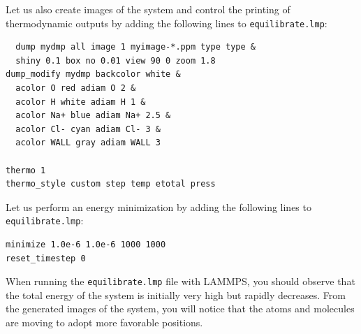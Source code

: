 \documentclass[9pt,tutorial]{livecoms}
\newcommand{\lmpcmd}[1]{\colorbox{listing}{\textcolor{command}{\small{#1}}}} %
\newcommand{\flecmd}[1]{\textcolor{command}{\texttt{#1}}} %
\begin{document}
Let us also create images of the system and control
the printing of thermodynamic outputs by adding the following lines
to \flecmd{equilibrate.lmp}:
\begin{lstlisting}
  dump mydmp all image 1 myimage-*.ppm type type &
  shiny 0.1 box no 0.01 view 90 0 zoom 1.8
dump_modify mydmp backcolor white &
  acolor O red adiam O 2 &
  acolor H white adiam H 1 &
  acolor Na+ blue adiam Na+ 2.5 &
  acolor Cl- cyan adiam Cl- 3 &
  acolor WALL gray adiam WALL 3

thermo 1
thermo_style custom step temp etotal press
\end{lstlisting}

Let us perform an energy minimization by adding the following lines to \flecmd{equilibrate.lmp}:
\begin{lstlisting}
minimize 1.0e-6 1.0e-6 1000 1000
reset_timestep 0
\end{lstlisting}
When running the \flecmd{equilibrate.lmp} file with LAMMPS, you should observe that the
total energy of the system is initially very high but rapidly decreases.  From the generated
images of the system, you will notice that the atoms and molecules are moving to adopt more favorable positions.






\end{document}
